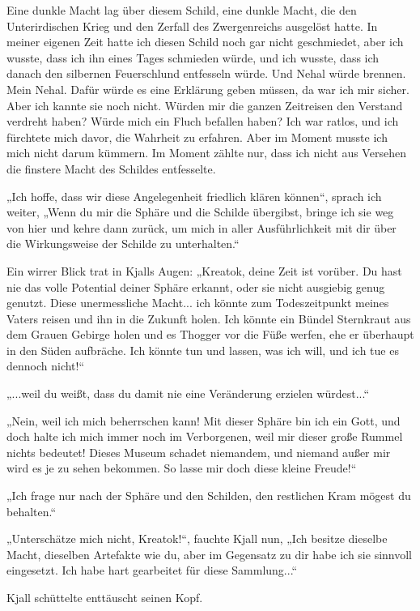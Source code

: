 \documentclass[10pt, a4paper, oneside]{book}
\begin{document}
Eine dunkle Macht lag über diesem Schild, eine dunkle Macht, die den Unterirdischen Krieg und den Zerfall des Zwergenreichs ausgelöst hatte. In meiner eigenen Zeit hatte ich diesen Schild noch gar nicht geschmiedet, aber ich wusste, dass ich ihn eines Tages schmieden würde, und ich wusste, dass ich danach den silbernen Feuerschlund entfesseln würde. Und Nehal würde brennen. Mein Nehal. Dafür würde es eine Erklärung geben müssen, da war ich mir sicher. Aber ich kannte sie noch nicht. Würden mir die ganzen Zeitreisen den Verstand verdreht haben? Würde mich ein Fluch befallen haben? Ich war ratlos, und ich fürchtete mich davor, die Wahrheit zu erfahren. Aber im Moment musste ich mich nicht darum kümmern. Im Moment zählte nur, dass ich nicht aus Versehen die finstere Macht des Schildes entfesselte.

„Ich hoffe, dass wir diese Angelegenheit friedlich klären können“, sprach ich weiter, „Wenn du mir die Sphäre und die Schilde übergibst, bringe ich sie weg von hier und kehre dann zurück, um mich in aller Ausführlichkeit mit dir über die Wirkungsweise der Schilde zu unterhalten.“

Ein wirrer Blick trat in Kjalls Augen: „Kreatok, deine Zeit ist vorüber. Du hast nie das volle Potential deiner Sphäre erkannt, oder sie nicht ausgiebig genug genutzt. Diese unermessliche Macht... ich könnte zum Todeszeitpunkt meines Vaters reisen und ihn in die Zukunft holen. Ich könnte ein Bündel Sternkraut aus dem Grauen Gebirge holen und es Thogger vor die Füße werfen, ehe er überhaupt in den Süden aufbräche. Ich könnte tun und lassen, was ich will, und ich tue es dennoch nicht!“

„...weil du weißt, dass du damit nie eine Veränderung erzielen würdest...“

„Nein, weil ich mich beherrschen kann! Mit dieser Sphäre bin ich ein Gott, und doch halte ich mich immer noch im Verborgenen, weil mir dieser große Rummel nichts bedeutet! Dieses Museum schadet niemandem, und niemand außer mir wird es je zu sehen bekommen. So lasse mir doch diese kleine Freude!“

„Ich frage nur nach der Sphäre und den Schilden, den restlichen Kram mögest du behalten.“

„Unterschätze mich nicht, Kreatok!“, fauchte Kjall nun, „Ich besitze dieselbe Macht, dieselben Artefakte wie du, aber im Gegensatz zu dir habe ich sie sinnvoll eingesetzt. Ich habe hart gearbeitet für diese Sammlung...“

Kjall schüttelte enttäuscht seinen Kopf.
\end{document}
